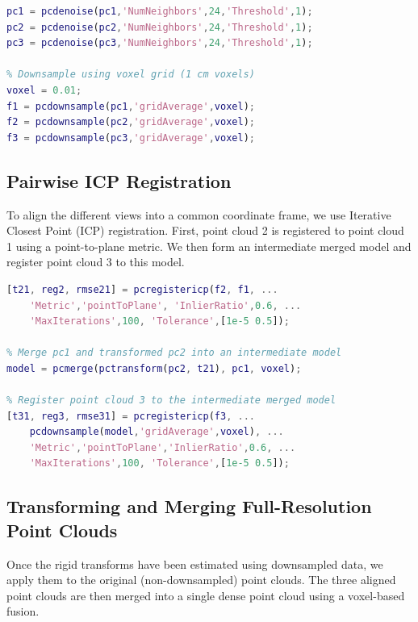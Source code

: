 \documentclass[10pt]{article}
\begin{document}
\begin{lstlisting}[language=Matlab,caption={Denoising and voxel downsampling}]
% Remove isolated noise points
pc1 = pcdenoise(pc1,'NumNeighbors',24,'Threshold',1);
pc2 = pcdenoise(pc2,'NumNeighbors',24,'Threshold',1);
pc3 = pcdenoise(pc3,'NumNeighbors',24,'Threshold',1);

% Downsample using voxel grid (1 cm voxels)
voxel = 0.01;
f1 = pcdownsample(pc1,'gridAverage',voxel);
f2 = pcdownsample(pc2,'gridAverage',voxel);
f3 = pcdownsample(pc3,'gridAverage',voxel);
\end{lstlisting}

\subsection{Pairwise ICP Registration}

To align the different views into a common coordinate frame, we use
Iterative Closest Point (ICP) registration. First, point cloud 2 is
registered to point cloud 1 using a point-to-plane metric. We then form
an intermediate merged model and register point cloud 3 to this model.

\begin{lstlisting}[language=Matlab,caption={ICP registration between downsampled point clouds}]
% Register point cloud 2 to point cloud 1
[t21, reg2, rmse21] = pcregistericp(f2, f1, ...
    'Metric','pointToPlane', 'InlierRatio',0.6, ...
    'MaxIterations',100, 'Tolerance',[1e-5 0.5]);

% Merge pc1 and transformed pc2 into an intermediate model
model = pcmerge(pctransform(pc2, t21), pc1, voxel);

% Register point cloud 3 to the intermediate merged model
[t31, reg3, rmse31] = pcregistericp(f3, ...
    pcdownsample(model,'gridAverage',voxel), ...
    'Metric','pointToPlane','InlierRatio',0.6, ...
    'MaxIterations',100, 'Tolerance',[1e-5 0.5]);
\end{lstlisting}

\subsection{Transforming and Merging Full-Resolution Point Clouds}

Once the rigid transforms have been estimated using downsampled data, we apply
them to the original (non-downsampled) point clouds. The three aligned point
clouds are then merged into a single dense point cloud using a voxel-based
fusion.
\end{document}
